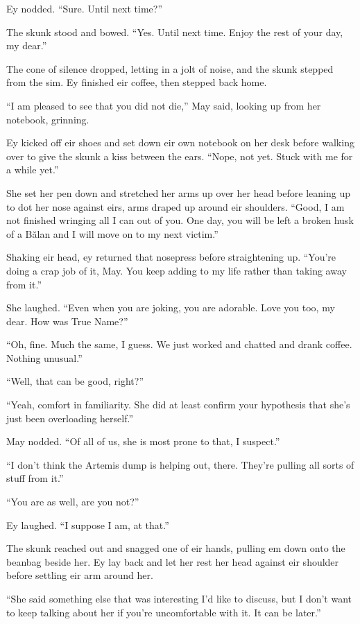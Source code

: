 Ey nodded. ``Sure. Until next time?''

The skunk stood and bowed. ``Yes. Until next time. Enjoy the rest of your day, my dear.''

The cone of silence dropped, letting in a jolt of noise, and the skunk stepped from the sim. Ey finished eir coffee, then stepped back home.

``I am pleased to see that you did not die,'' May said, looking up from her notebook, grinning.

Ey kicked off eir shoes and set down eir own notebook on her desk before walking over to give the skunk a kiss between the ears. ``Nope, not yet. Stuck with me for a while yet.''

She set her pen down and stretched her arms up over her head before leaning up to dot her nose against eirs, arms draped up around eir shoulders. ``Good, I am not finished wringing all I can out of you. One day, you will be left a broken husk of a Bălan and I will move on to my next victim.''

Shaking eir head, ey returned that nosepress before straightening up. ``You're doing a crap job of it, May. You keep adding to my life rather than taking away from it.''

She laughed. ``Even when you are joking, you are adorable. Love you too, my dear. How was True Name?''

``Oh, fine. Much the same, I guess. We just worked and chatted and drank coffee. Nothing unusual.''

``Well, that can be good, right?''

``Yeah, comfort in familiarity. She did at least confirm your hypothesis that she's just been overloading herself.''

May nodded. ``Of all of us, she is most prone to that, I suspect.''

``I don't think the Artemis dump is helping out, there. They're pulling all sorts of stuff from it.''

``You are as well, are you not?''

Ey laughed. ``I suppose I am, at that.''

The skunk reached out and snagged one of eir hands, pulling em down onto the beanbag beside her. Ey lay back and let her rest her head against eir shoulder before settling eir arm around her.

``She said something else that was interesting I'd like to discuss, but I don't want to keep talking about her if you're uncomfortable with it. It can be later.''

